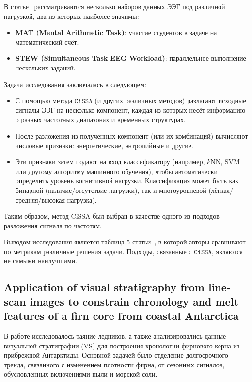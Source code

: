 \documentclass[12pt, specialist, subf
]{disser}
\theoremstyle{definition}
\newcommand{\CISSA}{\texttt{CiSSA}}
\begin{document}
В статье~\cite{cognitive} рассматриваются несколько наборов данных ЭЭГ под различной нагрузкой, два из которых наиболее значимы:

\begin{itemize}
	\item \textbf{MAT (Mental Arithmetic Task)}: участие студентов в задаче на математический счёт.
	\item \textbf{STEW (Simultaneous Task EEG Workload)}: параллельное выполнение нескольких заданий.
\end{itemize}

Задача исследования заключалась в следующем:

\begin{itemize}
	\item С помощью метода $\CISSA$ (и других различных методов) разлагают исходные сигналы ЭЭГ на несколько компонент, каждая из которых несёт информацию о разных частотных диапазонах и временных структурах.
	\item После разложения из полученных компонент (или их комбинаций) вычисляют числовые признаки: энергетические, энтропийные и другие.
	\item Эти признаки затем подают на вход классификатору (например, $k$NN, SVM или другому алгоритму машинного обучения), чтобы автоматически определить уровень когнитивной нагрузки. Классификация может быть как бинарной (наличие/отсутствие нагрузки), так и многоуровневой (лёгкая/средняя/высокая нагрузка).
\end{itemize}

Таким образом, метод CiSSA был выбран в качестве одного из подходов разложения сигнала по частотам.

Выводом исследования является таблица 5 статьи~\cite{cognitive}, в которой авторы сравнивают по метрикам различные решения задачи. Подходы, связанные с $\CISSA$, являются не самыми наилучшими.



\subsection{Application of visual stratigraphy from line-scan images to constrain chronology and melt features of a firn core from coastal Antarctica}

В работе \cite{Dey_Thamban_Laluraj_Mahalinganathan_Redkar_Kumar_Matsuoka_2023} исследовалось таяние ледников, а также анализировались данные визуальной стратиграфии (VS) для построения хронологии фирнового керна из прибрежной Антарктиды. Основной задачей было отделение долгосрочного тренда, связанного с изменением плотности фирна, от сезонных сигналов, обусловленных включениями пыли и морской соли.
\end{document}
